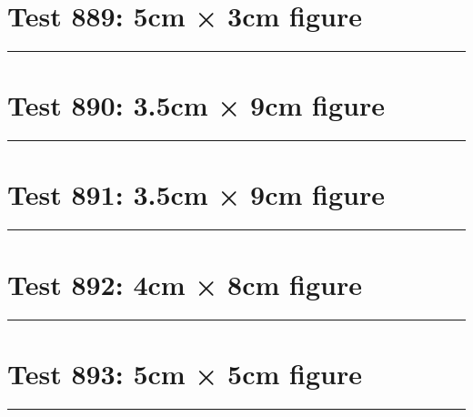 \documentclass[a4paper,11pt]{article}
\begin{document}
\section*{Test 889: 5cm × 3cm figure}
\begin{swarmwrap}%
  \begin{minipage}[t]{5cm}
    \centering
    \rule{\linewidth}{3cm}
  \end{minipage}%
\end{swarmwrap}%
\swarmwrapnext
\lipsum[14]
\lipsum[15]
\lipsum[16]
\section*{Test 890: 3.5cm × 9cm figure}
\begin{swarmwrap}%
  \begin{minipage}[t]{3cm}
    \centering
    \rule{\linewidth}{9cm}
  \end{minipage}%
\end{swarmwrap}%
\swarmwrapnext
\lipsum[44]
\lipsum[45]
\lipsum[46]
\lipsum[47]
\lipsum[48]
\lipsum[49]
\section*{Test 891: 3.5cm × 9cm figure}
\begin{swarmwrap}%
  \begin{minipage}[t]{3cm}
    \centering
    \rule{\linewidth}{9cm}
  \end{minipage}%
\end{swarmwrap}%
\swarmwrapnext
\lipsum[91]
\lipsum[92]
\lipsum[93]
\lipsum[94]
\lipsum[95]
\lipsum[96]
\section*{Test 892: 4cm × 8cm figure}
\begin{swarmwrap}%
  \begin{minipage}[t]{4cm}
    \centering
    \rule{\linewidth}{8cm}
  \end{minipage}%
\end{swarmwrap}%
\swarmwrapnext
\lipsum[124]
\lipsum[125]
\lipsum[126]
\section*{Test 893: 5cm × 5cm figure}
\begin{swarmwrap}%
  \begin{minipage}[t]{5cm}
    \centering
    \rule{\linewidth}{5cm}
  \end{minipage}%
\end{swarmwrap}%
\swarmwrapnext
\lipsum[117]
\lipsum[118]
\lipsum[119]
\lipsum[120]
\end{document}
